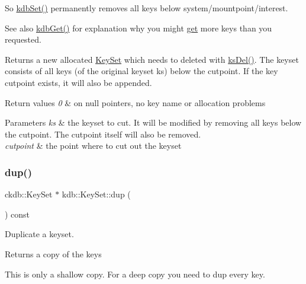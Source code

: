So \hyperlink{group__kdb_ga11436b058408f83d303ca5e996832bcf}{kdb\+Set()} permanently removes all keys below {\ttfamily system/mountpoint/interest}.

\begin{DoxySeeAlso}{See also}
\hyperlink{group__kdb_ga28e385fd9cb7ccfe0b2f1ed2f62453a1}{kdb\+Get()} for explanation why you might \hyperlink{classkdb_1_1KeySet_ad0b7d6498cf0b51ca6672704939a7f24}{get} more keys than you requested.
\end{DoxySeeAlso}
\begin{DoxyReturn}{Returns}
a new allocated \hyperlink{classkdb_1_1KeySet}{Key\+Set} which needs to deleted with \hyperlink{group__keyset_ga27e5c16473b02a422238c8d970db7ac8}{ks\+Del()}. The keyset consists of all keys (of the original keyset ks) below the cutpoint. If the key cutpoint exists, it will also be appended. 
\end{DoxyReturn}

\begin{DoxyRetVals}{Return values}
{\em 0} & on null pointers, no key name or allocation problems \\
\hline
\end{DoxyRetVals}

\begin{DoxyParams}{Parameters}
{\em ks} & the keyset to cut. It will be modified by removing all keys below the cutpoint. The cutpoint itself will also be removed. \\
\hline
{\em cutpoint} & the point where to cut out the keyset \\
\hline
\end{DoxyParams}
\mbox{\label{classkdb_1_1KeySet_ad3f2b936d66729690e8a8a45b5074baa}} 
\subsubsection{\texorpdfstring{dup()}{dup()}}
{\footnotesize\ttfamily ckdb\+::\+Key\+Set $\ast$ kdb\+::\+Key\+Set\+::dup (\begin{DoxyParamCaption}{ }\end{DoxyParamCaption}) const\hspace{0.3cm}{\ttfamily [inline]}}



Duplicate a keyset. 

\begin{DoxyReturn}{Returns}
a copy of the keys
\end{DoxyReturn}
This is only a shallow copy. For a deep copy you need to dup every key.


